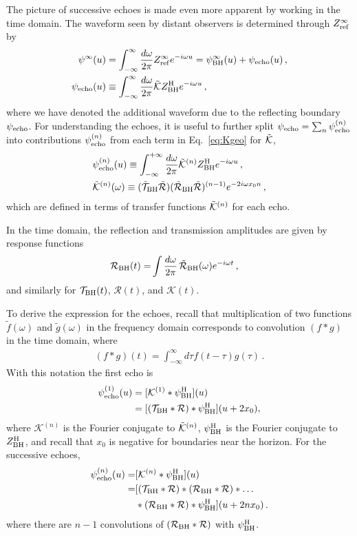 \begin{refsection}
The picture of successive echoes is made even more apparent by working in the time domain.
The waveform seen by distant observers is determined through $Z^{\infty}_{\rm ref}$ by
\begin{align}
\psi^\infty(u) & =  \int_{-\infty}^{\infty} \frac{d\omega}{2\pi} Z^{\infty}_{\rm ref} e^{-i\omega u} 
= \psi^{\infty}_{\rm BH}(u) + \psi_{\rm echo}(u)\,, \\
\psi_{\rm echo}(u) & \equiv \int_{-\infty}^{\infty} \frac{d\omega}{2\pi}   \tilde{\mathcal K} Z^{\rm H}_{\rm BH} e^{-i\omega u}  \,,
\end{align}
where we have denoted the additional waveform due to the reflecting boundary $\psi_{\rm echo}$.
For understanding the echoes, it is useful to further split $\psi_{\rm echo}= \sum_n \psi_{\rm echo}^{(n)}$ into contributions $\psi_{\rm echo}^{(n)}$ from each term in Eq.~\eqref{eq:Kgeo} for $\tilde{\mathcal K}$,
\begin{align}
&\psi_{\rm echo}^{(n)}(u)  \equiv \int_{-\infty}^{+\infty} \frac{d\omega}{2\pi}\tilde{\mathcal K}^{(n)}Z^{\rm H}_{\rm BH} e^{-i\omega u}  \,, \\
\label{eq:Kn}
&\tilde{\mathcal K}^{(n)}(\omega)\equiv(\tilde{\mathcal T}_{\rm BH} \tilde{\mathcal R})(\tilde{\mathcal R}_{\rm BH} \tilde{\mathcal R})^{(n-1)}e^{-2i\omega x_0 n} \,,
\end{align}
which are defined in terms of transfer functions $\tilde{\mathcal K}^{(n)}$ for each echo. 

In the time domain, the reflection and transmission amplitudes are given by response functions
\begin{align}
\mathcal R_{\rm BH}(t) = & \int \frac{d\omega}{2\pi} \, \tilde{\mathcal R}_{\rm BH}(\omega) e^{-i \omega t} \,,
\end{align}
and similarly for $\mathcal T_{\rm BH}(t)$, $\mathcal R(t)$, and $\mathcal{K}(t)$.

To derive the expression for the echoes, recall that multiplication of two functions $\tilde f(\omega)$ and $\tilde g(\omega)$ in the frequency domain corresponds to convolution $(f*g)$ in the time domain, where
\begin{align}
(f*g)(t) = \int_{-\infty}^{\infty} d\tau f(t - \tau) g(\tau)\,.
\end{align}
With this notation the first echo is 
\begin{align}
\psi_{\rm echo}^{(1)}(u) & = [\mathcal{K}^{(1)} *\psi^{\rm H}_{\rm BH}](u)  
\nonumber \\&
=  [(\mathcal T_{\rm BH} * \mathcal R)* \psi^{\rm H}_{\rm BH}](u + 2 x_0),
\end{align}
where $\mathcal K^{(n)}$ is the Fourier conjugate to $\tilde{\mathcal K}^{(n)}$, $\psi^{\rm H}_{\rm BH}$ is the Fourier conjugate to $Z^{\rm H}_{\rm BH}$, and recall that $x_0$ is negative for boundaries near the horizon.
For the successive echoes,
\begin{align}
\psi_{\rm echo}^{(n)}(u) =&
[\mathcal{K}^{(n)} *\psi^{\rm H}_{\rm BH}](u)
\nonumber \\
=& [(\mathcal T_{\rm BH} * \mathcal R) * (\mathcal R_{\rm BH} * \mathcal R) * \dots 
\notag \\ & 
* (\mathcal R_{\rm BH} * \mathcal R) * \psi^{\rm H}_{\rm BH}](u + 2nx_0) \,. \label{eq:echon}
\end{align}
where there are $n-1$ convolutions of $(\mathcal R_{\rm BH} * \mathcal R)$ with $\psi^{\rm H}_{\rm BH}$. 



\end{refsection}
